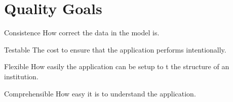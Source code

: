 \section*{Quality Goals}
\begin{frame}

Consistence How correct the data in the model is.

Testable The cost to ensure that the application performs intentionally.

Flexible How easily the application can be setup to t the structure of an institution.

Comprehensible How easy it is to understand the application.



\end{frame}